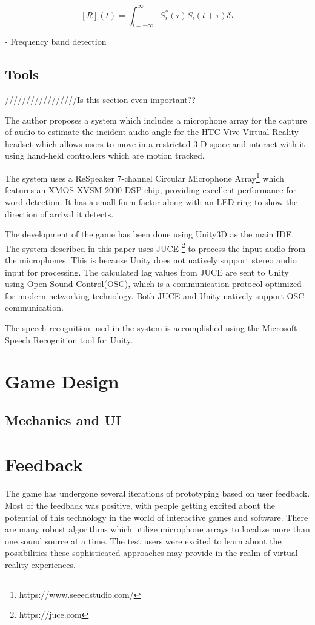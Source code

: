 \documentclass[convention]{aesconf}
\begin{document}
\[ [R] (t)  = \int_{i=-{\infty}}^{\infty} S_i^*(\tau) S_i(t+\tau) \delta \tau  \]

- Frequency band detection 

\subsection{Tools} 
/////////////////Is this section even important??

The author proposes a system which includes a microphone array for the capture of audio to estimate the incident audio angle for the HTC Vive Virtual Reality headset which allows users to move in a restricted 3-D space and interact with it using hand-held controllers which are motion tracked. 

The system uses a ReSpeaker 7-channel Circular Microphone Array\footnote{https://www.seeedstudio.com/} which features an XMOS XVSM-2000 DSP chip, providing excellent performance for word detection. It has a small form factor along with an LED ring to show the direction of arrival it detects. 

The development of the game has been done using Unity3D as the main IDE. The system described in this paper uses JUCE \footnote{https://juce.com} to process the input audio from the microphones. This is because Unity does not natively support stereo audio input for processing. The calculated lag values from JUCE are sent to Unity using Open Sound Control(OSC), which is a communication protocol optimized for modern networking technology. Both JUCE and Unity natively support OSC communication.

The speech recognition used in the system is accomplished using the Microsoft Speech Recognition tool for Unity. 

\section{Game Design} 

\subsection{Mechanics and UI} 

\section{Feedback} 
The game has undergone several iterations of prototyping based on user feedback. Most of the feedback was positive, with people getting excited about the potential of this technology in the world of interactive games and software. There are many robust algorithms which utilize microphone arrays to localize more than one sound source at a time. The test users were excited to learn about the possibilities these sophisticated approaches may provide in the realm of virtual reality experiences.
\end{document}
